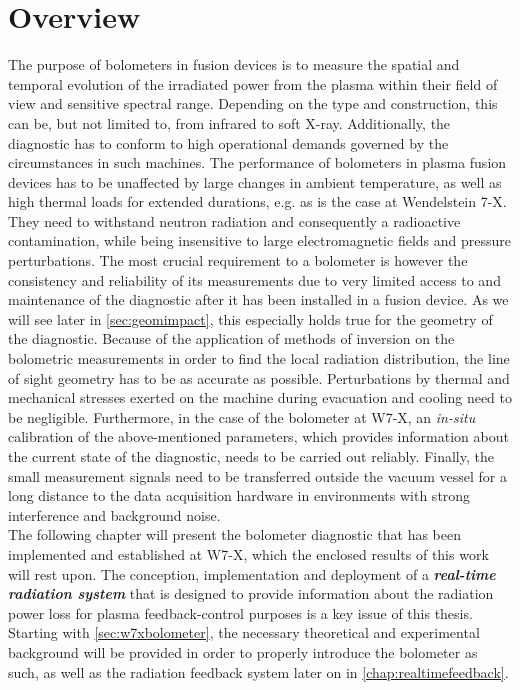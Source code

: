    \section{Overview}\label{sec:concept}%
%
        The purpose of bolometers in fusion devices is to measure the spatial and temporal evolution of the irradiated power from the plasma within their field of view and sensitive spectral range. Depending on the type and construction, this can be, but not limited to, from infrared to soft X-ray. Additionally, the diagnostic has to conform to high operational demands governed by the circumstances in such machines\cite{Giannone2002}. The performance of bolometers in plasma fusion devices has to be unaffected by large changes in ambient temperature, as well as high thermal loads for extended durations, e.g. as is the case at Wendelstein 7-X. They need to withstand neutron radiation and consequently a radioactive contamination, while being insensitive to large electromagnetic fields and pressure perturbations. The most crucial requirement to a bolometer is however the consistency and reliability of its measurements due to very limited access to and maintenance of the diagnostic after it has been installed in a fusion device. As we will see later in \autoref{sec:geomimpact}, this especially holds true for the geometry of the diagnostic. Because of the application of methods of inversion on the bolometric measurements in order to find the local radiation distribution, the line of sight geometry has to be as accurate as possible. Perturbations by thermal and mechanical stresses exerted on the machine during evacuation and cooling need to be negligible. Furthermore, in the case of the bolometer at W7-X, an \textit{in-situ} calibration of the above-mentioned parameters, which provides information about the current state of the diagnostic, needs to be carried out reliably. Finally, the small measurement signals need to be transferred outside the vacuum vessel for a long distance to the data acquisition hardware in environments with strong interference and background noise.\\%
        The following chapter will present the bolometer diagnostic that has been implemented and established at W7-X, which the enclosed results of this work will rest upon. The conception, implementation and deployment of a \textit{\textbf{real-time radiation system}} that is designed to provide information about the radiation power loss for plasma feedback-control purposes is a key issue of this thesis. Starting with \cref{sec:w7xbolometer}, the necessary theoretical and experimental background will be provided in order to properly introduce the bolometer as such, as well as the radiation feedback system later on in \cref{chap:realtimefeedback}.%

